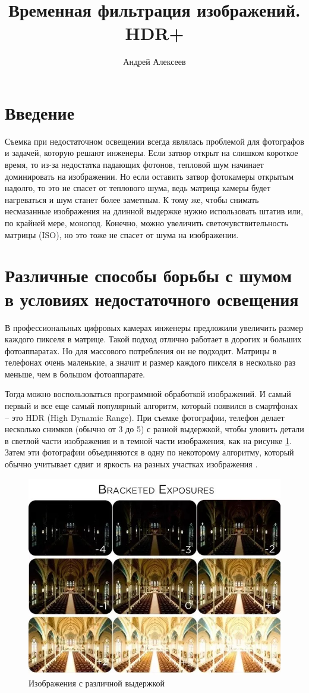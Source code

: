 \documentclass[a4paper,12pt]{article}
\begin{document}
 
\title{Временная фильтрация изображений. HDR+}
\author{Андрей Алексеев}
\maketitle

\section{Введение}
Съемка при недостаточном освещении всегда являлась проблемой для фотографов и задачей, которую решают инженеры. Если затвор открыт на слишком короткое время, то из-за недостатка падающих фотонов, тепловой шум начинает доминировать на изображении. Но если оставить затвор фотокамеры открытым надолго, то это не спасет от теплового шума, ведь матрица камеры будет нагреваться и шум станет более заметным. К тому же, чтобы снимать несмазанные изображения на длинной выдержке нужно использовать штатив или, по крайней мере, монопод. Конечно, можно увеличить светочувствительность матрицы (ISO), но это тоже не спасет от шума на изображении.


\section{Различные способы борьбы с шумом в условиях недостаточного освещения}
В профессиональных цифровых камерах инженеры предложили увеличить размер каждого пикселя в матрице. Такой подход отлично работает в дорогих и больших фотоаппаратах. Но для массового потребления он не подходит. Матрицы в телефонах очень маленькие, а значит и размер каждого пикселя в несколько раз меньше, чем в большом фотоаппарате.

Тогда можно воспользоваться программной обработкой изображений. И самый первый и все еще самый популярный алгоритм, который появился в смартфонах -- это HDR (High Dynamic Range). При съемке фотографии, телефон делает несколько снимков (обычно от 3 до 5) с разной выдержкой, чтобы уловить детали в светлой части изображения и в темной части изображения, как на рисунке \ref{fig:shutter}. Затем эти фотографии объединяются в одну по некоторому алгоритму, который обычно учитывает сдвиг и яркость на разных участках изображения \cite{Habr1}.

\begin{figure}[h]
\centering
\includegraphics[width=0.7\linewidth]{shutter_speed.jpg}
\caption{Изображения с различной выдержкой}
\label{fig:shutter}
\end{figure}
\end{document}
